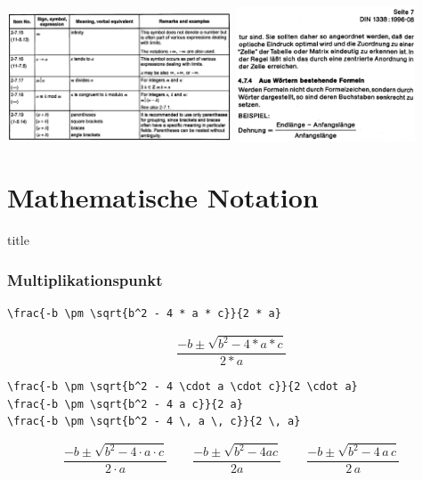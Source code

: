 \documentclass[aspectratio=169, 10pt]{beamer}
\makeatletter
\newcommand\sectiontitlepage{
    \miniframesoff
    \begin{frame}
        \vfill
        \centering
        \begin{beamercolorbox}[sep=8pt,center,shadow=true,rounded=true]{title}
            \usebeamerfont{title}\insertsectionhead\par%
        \end{beamercolorbox}
        \vfill
    \end{frame}
    \miniframeson
}
\let\beamer@writeslidentry@miniframeson=\beamer@writeslidentry
\def\beamer@writeslidentry@miniframesoff{%
    \expandafter\beamer@ifempty\expandafter{\beamer@framestartpage}{}%
    {%
        \clearpage\beamer@notesactions%
    }
}
\newcommand*{\miniframeson}{\let\beamer@writeslidentry=\beamer@writeslidentry@miniframeson}
\newcommand*{\miniframesoff}{\let\beamer@writeslidentry=\beamer@writeslidentry@miniframesoff}
\makeatother
\begin{document}
\begin{frame}[fragile]
    \includegraphics[width=0.5\textwidth]{images/iso-extract}\hfill
    \includegraphics[width=0.4\textwidth]{images/din-extract}
\end{frame}

\section{Mathematische Notation}

\sectiontitlepage

\begin{frame}[fragile]
    \frametitle{Multiplikationspunkt}
    \begin{wrong}
        \begin{lstlisting}
\frac{-b \pm \sqrt{b^2 - 4 * a * c}}{2 * a}
        \end{lstlisting}
    \end{wrong}
    \pause
    \begin{wrong}
        \begin{equation*}
            \frac{-b \pm \sqrt{b^2 - 4 * a * c}}{2 * a}
        \end{equation*}
    \end{wrong}
    \pause
    \begin{lstlisting}
\frac{-b \pm \sqrt{b^2 - 4 \cdot a \cdot c}}{2 \cdot a}
\frac{-b \pm \sqrt{b^2 - 4 a c}}{2 a}
\frac{-b \pm \sqrt{b^2 - 4 \, a \, c}}{2 \, a}
    \end{lstlisting}

    \begin{equation*}
        \frac{-b \pm \sqrt{b^2 - 4 \cdot a \cdot c}}{2 \cdot a}
        \qquad
        \frac{-b \pm \sqrt{b^2 - 4 a c}}{2 a}
        \qquad
        \frac{-b \pm \sqrt{b^2 - 4 \, a \, c}}{2 \, a}
    \end{equation*}
    \pause
\end{frame}
\end{document}
